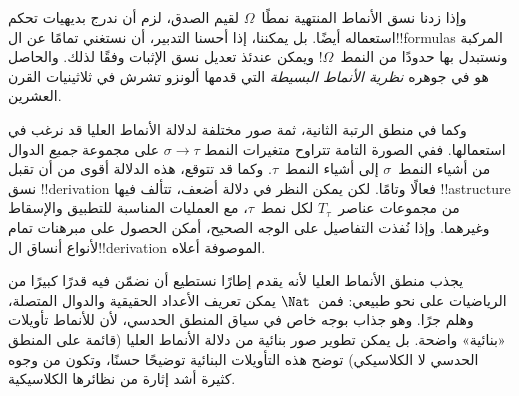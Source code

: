 \documentclass[../../../include/open-logic-section]{subfiles}
\begin{document}
وإذا زدنا نسق الأنماط المنتهية نمطًا~$\Omega$ لقيم الصدق، لزم أن ندرج
بديهيات تحكم استعماله أيضًا. بل يمكننا، إذا أحسنا التدبير، أن نستغني
تمامًا عن ال!!{formula}s المركبة ونستبدل بها حدودًا من النمط~$\Omega$!{}
ويمكن عندئذ تعديل نسق الإثبات وفقًا لذلك. والحاصل هو في جوهره
\emph{نظرية الأنماط البسيطة} التي قدمها ألونزو تشرش في ثلاثينيات القرن
العشرين.

وكما في منطق الرتبة الثانية، ثمة صور مختلفة لدلالة الأنماط العليا قد
نرغب في استعمالها. ففي الصورة التامة تتراوح متغيرات النمط $\sigma
\to \tau$ على مجموعة \emph{جميع} الدوال من أشياء النمط~$\sigma$ إلى
أشياء النمط~$\tau$. وكما قد تتوقع، هذه الدلالة أقوى من أن تقبل نسق
!!{derivation} فعالًا وتامًا. لكن يمكن النظر في دلالة أضعف، تتألف فيها
!!a{structure} من مجموعات عناصر~$T_\tau$ لكل نمط~$\tau$، مع العمليات
المناسبة للتطبيق والإسقاط وغيرهما. وإذا نُفذت التفاصيل على الوجه
الصحيح، أمكن الحصول على مبرهنات تمام لأنواع أنساق ال!!{derivation}
الموصوفة أعلاه.

يجذب منطق الأنماط العليا لأنه يقدم إطارًا نستطيع أن نضمّن فيه قدرًا
كبيرًا من الرياضيات على نحو طبيعي: فمن~$\Nat$ يمكن تعريف الأعداد
الحقيقية والدوال المتصلة، وهلم جرًا. وهو جذاب بوجه خاص في سياق المنطق
الحدسي، لأن للأنماط تأويلات «بنائية» واضحة. بل يمكن تطوير صور بنائية
من دلالة الأنماط العليا (قائمة على المنطق الحدسي لا الكلاسيكي) توضح
هذه التأويلات البنائية توضيحًا حسنًا، وتكون من وجوه كثيرة أشد إثارة من
نظائرها الكلاسيكية.
\end{document}
